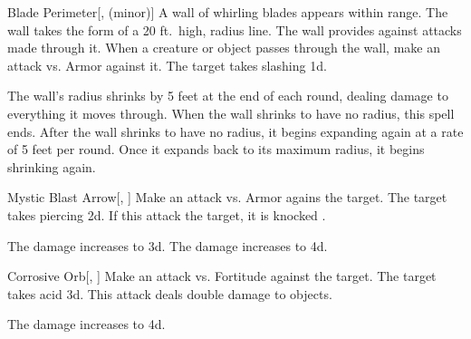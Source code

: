 \lowercase{\hypertarget{spell:Blade Perimeter}{}}\label{spell:Blade Perimeter}
\begin{freeability}[Rank 4]{\hypertarget{spell:Blade Perimeter}{Blade Perimeter}}[,  (minor)]
A wall of whirling blades appears within \rngmed range.
The wall takes the form of a 20 ft.\ high, \areamed radius line.
The wall provides  against attacks made through it.
When a creature or object passes through the wall, make an attack vs. Armor against it.
\hit The target takes slashing  \minus1d.

\rankline
{} The wall's radius shrinks by 5 feet at the end of each round, dealing damage to everything it moves through.
When the wall shrinks to have no radius, this spell ends.
 After the wall shrinks to have no radius, it begins expanding again at a rate of 5 feet per round.
Once it expands back to its maximum radius, it begins shrinking again.

\end{freeability}
\vspace{0.25em}



\lowercase{\hypertarget{spell:Mystic Blast Arrow}{}}\label{spell:Mystic Blast Arrow}
\begin{freeability}[Rank 4]{\hypertarget{spell:Mystic Blast Arrow}{Mystic Blast Arrow}}[, ]
Make an attack vs. Armor agains the target.
\hit The target takes piercing  \plus2d.
If this attack  the target, it is knocked .

\rankline
{} The damage increases to  \plus3d.
 The damage increases to  \plus4d.

\end{freeability}
\vspace{0.25em}



\lowercase{\hypertarget{spell:Corrosive Orb}{}}\label{spell:Corrosive Orb}
\begin{freeability}[Rank 5]{\hypertarget{spell:Corrosive Orb}{Corrosive Orb}}[, ]
Make an attack vs. Fortitude against the target.
\hit The target takes acid  \plus3d.
This attack deals double damage to objects.

\rankline
{} The damage increases to  \plus4d.

\end{freeability}
\vspace{0.25em}



